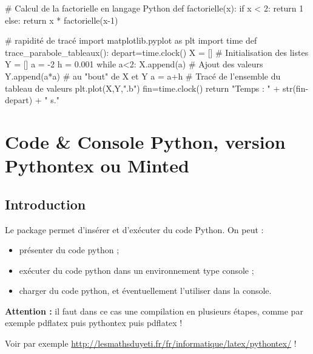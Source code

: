\documentclass{article}
\newcommand\ctex[1]{\tcbox[vignettelatex]{#1}}
\begin{document}
\begin{codesortie}
\begin{scontents}[overwrite,write-out=testscript.py]
# Calcul de la factorielle en langage Python
def factorielle(x):
	if x < 2:
		return 1
	else:
		return x * factorielle(x-1)

# rapidité de tracé
import matplotlib.pyplot as plt
import time
def trace_parabole_tableaux():
	depart=time.clock()
	X = [] # Initialisation des listes
	Y = []
	a = -2
	h = 0.001
	while a<2:
		X.append(a) # Ajout des valeurs
		Y.append(a*a) # au "bout" de X et Y
		a = a+h
	# Tracé de l'ensemble du tableau de valeurs
	plt.plot(X,Y,".b")
	fin=time.clock()
	return "Temps : " + str(fin-depart) + " s."
\end{scontents}

\end{codesortie}

\newpage

\section{Code \& Console Python, version Pythontex ou Minted}

\subsection{Introduction}

\begin{codeidee}
Le {package} \ctex{pythontex} permet d'insérer et d'exécuter du code Python. On peut :

\begin{itemize}
	\item présenter du code python ;
	\item exécuter du code python dans un environnement type \og console \fg{} ;
	\item charger du code python, et éventuellement l'utiliser dans la console.
\end{itemize}
\end{codeidee}

\begin{codeinfo}
\textbf{Attention : }il faut dans ce cas une compilation en plusieurs étapes, comme par exemple \textsf{pdflatex puis pythontex puis pdflatex} !

Voir par exemple \url{http://lesmathsduyeti.fr/fr/informatique/latex/pythontex/} !
\end{codeinfo}
\end{document}
